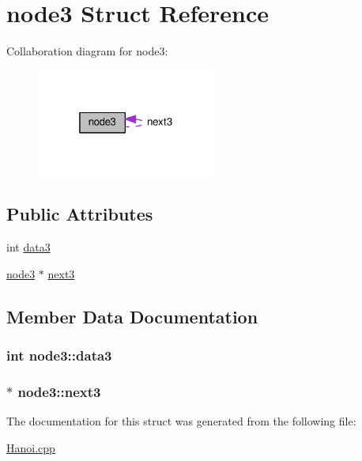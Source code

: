 \hypertarget{structnode3}{}\section{node3 Struct Reference}
\label{structnode3}


Collaboration diagram for node3\+:
\nopagebreak
\begin{figure}[H]
\begin{center}
\leavevmode
\includegraphics[width=169pt]{structnode3__coll__graph}
\end{center}
\end{figure}
\subsection*{Public Attributes}
\begin{DoxyCompactItemize}
\item 
int \hyperlink{structnode3_a6c21d03cc1ba8392be4e7fc60406a987}{data3}
\item 
\hyperlink{structnode3}{node3} $\ast$ \hyperlink{structnode3_a342e0c7f13d00bc39454b6fedaec5998}{next3}
\end{DoxyCompactItemize}


\subsection{Member Data Documentation}
\subsubsection[{\texorpdfstring{data3}{data3}}]{\setlength{\rightskip}{0pt plus 5cm}int node3\+::data3}\hypertarget{structnode3_a6c21d03cc1ba8392be4e7fc60406a987}{}\label{structnode3_a6c21d03cc1ba8392be4e7fc60406a987}
\subsubsection[{\texorpdfstring{next3}{next3}}]{$\ast$ node3\+::next3}\hypertarget{structnode3_a342e0c7f13d00bc39454b6fedaec5998}{}\label{structnode3_a342e0c7f13d00bc39454b6fedaec5998}


The documentation for this struct was generated from the following file\+:\begin{DoxyCompactItemize}
\item 
\hyperlink{Hanoi_8cpp}{Hanoi.\+cpp}\end{DoxyCompactItemize}
